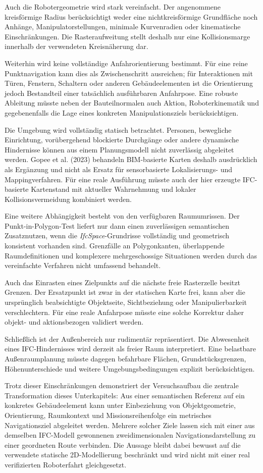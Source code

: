 Auch die Robotergeometrie wird stark vereinfacht. Der angenommene kreisförmige Radius berücksichtigt
weder eine nichtkreisförmige Grundfläche noch Anhänge, Manipulatorstellungen, minimale Kurvenradien
oder kinematische Einschränkungen. Die Rasteraufweitung stellt deshalb nur eine Kollisionsmarge
innerhalb der verwendeten Kreisnäherung dar.

Weiterhin wird keine vollständige Anfahrorientierung bestimmt. Für eine reine Punktnavigation kann
dies als Zwischenschritt ausreichen; für Interaktionen mit Türen, Fenstern, Schaltern oder anderen
Gebäudeelementen ist die Orientierung jedoch Bestandteil einer tatsächlich ausführbaren Anfahrpose.
Eine robuste Ableitung müsste neben der Bauteilnormalen auch Aktion, Roboterkinematik und
gegebenenfalls die Lage eines konkreten Manipulationsziels berücksichtigen.

Die Umgebung wird vollständig statisch betrachtet. Personen, bewegliche Einrichtung, vorübergehend
blockierte Durchgänge oder andere dynamische Hindernisse können aus einem Planungsmodell nicht
zuverlässig abgeleitet werden. Gopee et al. (2023) behandeln BIM-basierte Karten deshalb
ausdrücklich als Ergänzung und nicht als Ersatz für sensorbasierte Lokalisierungs- und
Mappingverfahren. Für eine reale Ausführung müsste auch der hier erzeugte IFC-basierte Kartenstand
mit aktueller Wahrnehmung und lokaler Kollisionsvermeidung kombiniert werden.

Eine weitere Abhängigkeit besteht von den verfügbaren Raumumrissen. Der Punkt-in-Polygon-Test
liefert nur dann einen zuverlässigen semantischen Zusatznutzen, wenn die
\textit{IfcSpace}-Grundrisse vollständig und geometrisch konsistent vorhanden sind. Grenzfälle an
Polygonkanten, überlappende Raumdefinitionen und komplexere mehrgeschossige Situationen werden durch
das vereinfachte Verfahren nicht umfassend behandelt.

Auch das Einrasten eines Zielpunkts auf die nächste freie Rasterzelle besitzt Grenzen. Der
Ersatzpunkt ist zwar in der statischen Karte frei, kann aber die ursprünglich beabsichtigte
Objektseite, Sichtbeziehung oder Manipulierbarkeit verschlechtern. Für eine reale Anfahrpose müsste
eine solche Korrektur daher objekt- und aktionsbezogen validiert werden.

Schließlich ist der Außenbereich nur rudimentär repräsentiert. Die Abwesenheit eines
IFC-Hindernisses wird derzeit als freier Raum interpretiert. Eine belastbare Außenraumplanung müsste
dagegen befahrbare Flächen, Grundstücksgrenzen, Höhenunterschiede und weitere Umgebungsbedingungen
explizit berücksichtigen.

Trotz dieser Einschränkungen demonstriert der Versuchsaufbau die zentrale Transformation dieses
Unterkapitels: Aus einer semantischen Referenz auf ein konkretes Gebäudeelement kann unter
Einbeziehung von Objektgeometrie, Orientierung, Raumkontext und Missionsreihenfolge ein metrisches
Navigationsziel abgeleitet werden. Mehrere solcher Ziele lassen sich mit einer aus demselben
IFC-Modell gewonnenen zweidimensionalen Navigationsdarstellung zu einer geordneten Route verbinden.
Die Aussage bleibt dabei bewusst auf die verwendete statische 2D-Modellierung beschränkt und wird
nicht mit einer real verifizierten Roboterfahrt gleichgesetzt.

